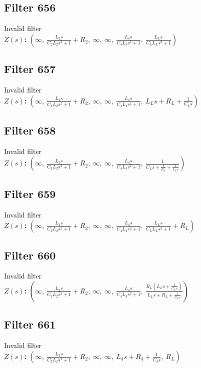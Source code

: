 \documentclass{article}
\begin{document}
\subsection*{Filter 656}
Invalid filter \\ 
\textbf{$Z(s)$:} $\left( \infty, \  \frac{L_{2} s}{C_{2} L_{2} s^{2} + 1} + R_{2}, \  \infty, \  \infty, \  \frac{L_{4} s}{C_{4} L_{4} s^{2} + 1}, \  \frac{L_{L} s}{C_{L} L_{L} s^{2} + 1}\right)$ \\ 
\subsection*{Filter 657}
Invalid filter \\ 
\textbf{$Z(s)$:} $\left( \infty, \  \frac{L_{2} s}{C_{2} L_{2} s^{2} + 1} + R_{2}, \  \infty, \  \infty, \  \frac{L_{4} s}{C_{4} L_{4} s^{2} + 1}, \  L_{L} s + R_{L} + \frac{1}{C_{L} s}\right)$ \\ 
\subsection*{Filter 658}
Invalid filter \\ 
\textbf{$Z(s)$:} $\left( \infty, \  \frac{L_{2} s}{C_{2} L_{2} s^{2} + 1} + R_{2}, \  \infty, \  \infty, \  \frac{L_{4} s}{C_{4} L_{4} s^{2} + 1}, \  \frac{1}{C_{L} s + \frac{1}{R_{L}} + \frac{1}{L_{L} s}}\right)$ \\ 
\subsection*{Filter 659}
Invalid filter \\ 
\textbf{$Z(s)$:} $\left( \infty, \  \frac{L_{2} s}{C_{2} L_{2} s^{2} + 1} + R_{2}, \  \infty, \  \infty, \  \frac{L_{4} s}{C_{4} L_{4} s^{2} + 1}, \  \frac{L_{L} s}{C_{L} L_{L} s^{2} + 1} + R_{L}\right)$ \\ 
\subsection*{Filter 660}
Invalid filter \\ 
\textbf{$Z(s)$:} $\left( \infty, \  \frac{L_{2} s}{C_{2} L_{2} s^{2} + 1} + R_{2}, \  \infty, \  \infty, \  \frac{L_{4} s}{C_{4} L_{4} s^{2} + 1}, \  \frac{R_{L} \left(L_{L} s + \frac{1}{C_{L} s}\right)}{L_{L} s + R_{L} + \frac{1}{C_{L} s}}\right)$ \\ 
\subsection*{Filter 661}
Invalid filter \\ 
\textbf{$Z(s)$:} $\left( \infty, \  \frac{L_{2} s}{C_{2} L_{2} s^{2} + 1} + R_{2}, \  \infty, \  \infty, \  L_{4} s + R_{4} + \frac{1}{C_{4} s}, \  R_{L}\right)$ \\ 
\end{document}
